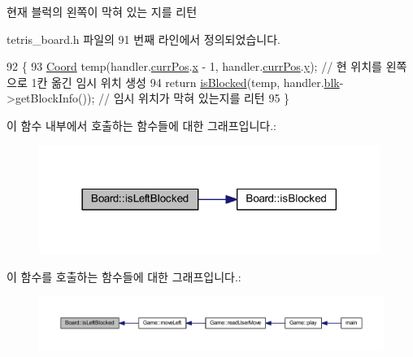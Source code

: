 현재 블럭의 왼쪽이 막혀 있는 지를 리턴 



tetris\+\_\+board.\+h 파일의 91 번째 라인에서 정의되었습니다.


\begin{DoxyCode}
92     \{
93         \mbox{\hyperlink{struct_coord}{Coord}} temp(handler.\mbox{\hyperlink{class_block_handler_a11bd634fdc179446f9c6751e2394999e}{currPos}}.\mbox{\hyperlink{struct_coord_a696eaa744360fc791d0e3b331c549dbe}{x}} - 1, handler.\mbox{\hyperlink{class_block_handler_a11bd634fdc179446f9c6751e2394999e}{currPos}}.\mbox{\hyperlink{struct_coord_a214166cca70cef7dda9201689c3e81ab}{y}}); \textcolor{comment}{// 현 위치를 왼쪽으로 1칸 옮긴 임시
       위치 생성}
94         \textcolor{keywordflow}{return} \mbox{\hyperlink{class_board_a61ff9b1284e5c3e1214a780361ed650b}{isBlocked}}(temp, handler.\mbox{\hyperlink{class_block_handler_ab57212ded2552ab5559d278c8538c454}{blk}}->getBlockInfo());  \textcolor{comment}{// 임시 위치가 막혀 있는지를 리턴}
95     \}
\end{DoxyCode}
이 함수 내부에서 호출하는 함수들에 대한 그래프입니다.\+:
\nopagebreak
\begin{figure}[H]
\begin{center}
\leavevmode
\includegraphics[width=314pt]{class_board_a5545704e21b5f7447eb9ffe014954cb3_cgraph}
\end{center}
\end{figure}
이 함수를 호출하는 함수들에 대한 그래프입니다.\+:
\nopagebreak
\begin{figure}[H]
\begin{center}
\leavevmode
\includegraphics[width=350pt]{class_board_a5545704e21b5f7447eb9ffe014954cb3_icgraph}
\end{center}
\end{figure}
\mbox{\label{class_board_a4b84310dd1ac3a08a3180361508a43e3}} 

